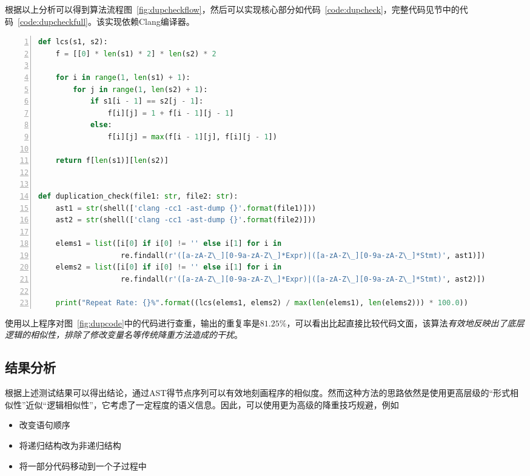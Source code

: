 \documentclass[a4paper,twoside]{article}
\begin{document}
\begin{spacing}{1.2}
\newpage

根据以上分析可以得到算法流程图~\ref{fig:dupcheckflow}，然后可以实现核心部分如代码~\ref{code:dupcheck}，完整代码见节中的代码~\ref{code:dupcheckfull}。该实现依赖Clang编译器。

\begin{lstlisting}[language=Python,numbers=left,style=PythonStyle,caption=核心部分代码,label={code:dupcheck}]
def lcs(s1, s2):
    f = [[0] * len(s1) * 2] * len(s2) * 2

    for i in range(1, len(s1) + 1):
        for j in range(1, len(s2) + 1):
            if s1[i - 1] == s2[j - 1]:
                f[i][j] = 1 + f[i - 1][j - 1]
            else:
                f[i][j] = max(f[i - 1][j], f[i][j - 1])

    return f[len(s1)][len(s2)]


def duplication_check(file1: str, file2: str):
    ast1 = str(shell(['clang -cc1 -ast-dump {}'.format(file1)]))
    ast2 = str(shell(['clang -cc1 -ast-dump {}'.format(file2)]))

    elems1 = list([i[0] if i[0] != '' else i[1] for i in
                   re.findall(r'([a-zA-Z\_][0-9a-zA-Z\_]*Expr)|([a-zA-Z\_][0-9a-zA-Z\_]*Stmt)', ast1)])
    elems2 = list([i[0] if i[0] != '' else i[1] for i in
                   re.findall(r'([a-zA-Z\_][0-9a-zA-Z\_]*Expr)|([a-zA-Z\_][0-9a-zA-Z\_]*Stmt)', ast2)])

    print("Repeat Rate: {}%".format((lcs(elems1, elems2) / max(len(elems1), len(elems2))) * 100.0))
\end{lstlisting}

使用以上程序对图~\ref{fig:dupcode}中的代码进行查重，输出的重复率是$81.25\%$，可以看出比起直接比较代码文面，该算法\emph{有效地反映出了底层逻辑的相似性，排除了修改变量名等传统降重方法造成的干扰}。

\subsection{结果分析}

根据上述测试结果可以得出结论，通过AST得节点序列可以有效地刻画程序的相似度。然而这种方法的思路依然是使用更高层级的“形式相似性”近似“逻辑相似性”，它考虑了一定程度的语义信息。因此，可以使用更为高级的降重技巧规避，例如

\begin{itemize}
	\item 改变语句顺序
	\item 将递归结构改为非递归结构
	\item 将一部分代码移动到一个子过程中
\end{itemize}


\end{spacing}
\end{document}
